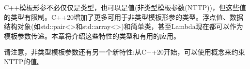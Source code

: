 C++模板形参不必仅仅是类型，也可以是值(非类型模板参数(NTTP))，但这些值的类型有限制。C++20增加了更多可用于非类型模板形参的类型。浮点值、数据结构对象(如std::pair<>和std::array<>)和简单类，甚至Lambda现在都可以作为模板参数传递。本章将介绍这些特性的类型和有用的应用。

请注意，非类型模板参数还有另一个新特性:从C++20开始，可以使用概念来约束NTTP的值。
